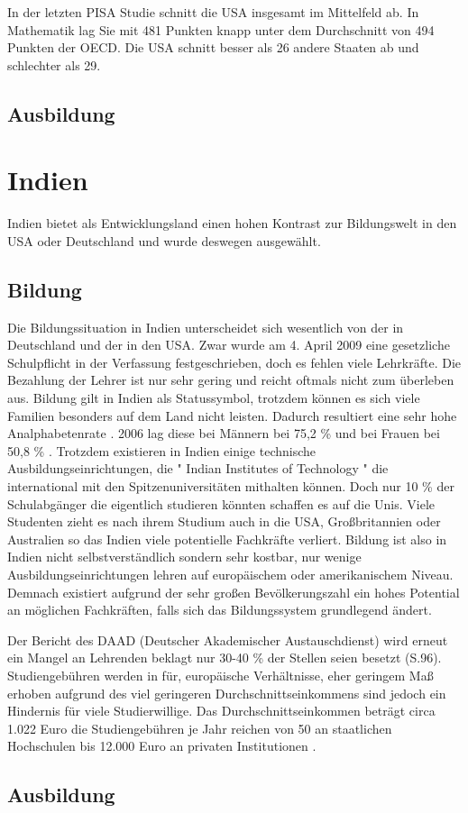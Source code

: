 In der letzten PISA Studie schnitt die USA insgesamt im Mittelfeld ab. In Mathematik lag Sie mit 481 Punkten knapp unter dem Durchschnitt von 494 Punkten der OECD. Die USA schnitt besser als 26 andere Staaten ab und schlechter als 29. \cite{pisa2}

\subsection{Ausbildung}

\section{Indien}
Indien bietet als Entwicklungsland einen hohen Kontrast zur Bildungswelt in den USA oder Deutschland und wurde deswegen ausgewählt.

\subsection{Bildung}
Die Bildungssituation in Indien unterscheidet sich wesentlich von der in Deutschland und der in den USA. Zwar wurde am 4. April 2009 eine gesetzliche Schulpflicht in der Verfassung festgeschrieben, doch es fehlen viele Lehrkräfte. \cite{dw} Die Bezahlung der Lehrer ist nur sehr gering und reicht oftmals nicht zum überleben aus. Bildung gilt in Indien als Statussymbol, trotzdem können es sich viele Familien besonders auf dem Land nicht leisten. Dadurch resultiert eine sehr hohe Analphabetenrate \cite{analpha}. 2006 lag diese bei Männern bei 75,2 \% und bei Frauen bei 50,8 \% .
Trotzdem existieren in Indien einige technische Ausbildungseinrichtungen, die " Indian Institutes of Technology " die international mit den Spitzenuniversitäten mithalten können. Doch nur 10 \% der Schulabgänger die eigentlich studieren könnten schaffen es auf die Unis. Viele Studenten zieht es nach ihrem Studium auch in die USA, Großbritannien oder Australien so das Indien viele potentielle Fachkräfte verliert.
Bildung ist also in Indien nicht selbstverständlich sondern sehr kostbar, nur wenige Ausbildungseinrichtungen lehren auf europäischem oder amerikanischem Niveau. Demnach existiert aufgrund der sehr großen Bevölkerungszahl ein hohes Potential an möglichen Fachkräften, falls sich das Bildungssystem grundlegend ändert.

Der Bericht des DAAD (Deutscher Akademischer Austauschdienst) \cite{daad} wird erneut ein Mangel an Lehrenden beklagt nur 30-40 \% der Stellen seien besetzt (S.96).
Studiengebühren werden in für, europäische Verhältnisse, eher geringem Maß erhoben aufgrund des viel geringeren Durchschnittseinkommens sind jedoch ein Hindernis für viele Studierwillige. Das Durchschnittseinkommen beträgt circa 1.022 Euro \cite{ausa} die Studiengebühren je Jahr reichen von 50 an staatlichen Hochschulen bis 12.000 Euro an privaten Institutionen \cite[101]{daad}.


\subsection{Ausbildung}








